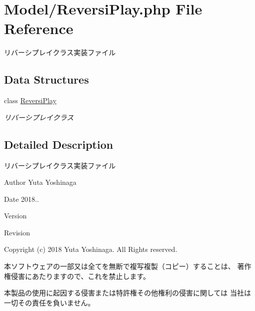 \hypertarget{_reversi_play_8php}{}\section{Model/\+Reversi\+Play.php File Reference}
\label{_reversi_play_8php}


リバーシプレイクラス実装ファイル  


\subsection*{Data Structures}
\begin{DoxyCompactItemize}
\item 
class \hyperlink{class_reversi_play}{Reversi\+Play}
\begin{DoxyCompactList}\small\item\em リバーシプレイクラス \end{DoxyCompactList}\end{DoxyCompactItemize}


\subsection{Detailed Description}
リバーシプレイクラス実装ファイル 

\begin{DoxyAuthor}{Author}
Yuta Yoshinaga 
\end{DoxyAuthor}
\begin{DoxyDate}{Date}
2018.. 
\end{DoxyDate}
\begin{DoxyParagraph}{Version}

\end{DoxyParagraph}
\begin{DoxyParagraph}{Revision}

\end{DoxyParagraph}


Copyright (c) 2018 Yuta Yoshinaga. All Rights reserved.


\begin{DoxyItemize}
\item 本ソフトウェアの一部又は全てを無断で複写複製（コピー）することは、 著作権侵害にあたりますので、これを禁止します。
\item 本製品の使用に起因する侵害または特許権その他権利の侵害に関しては 当社は一切その責任を負いません。 
\end{DoxyItemize}